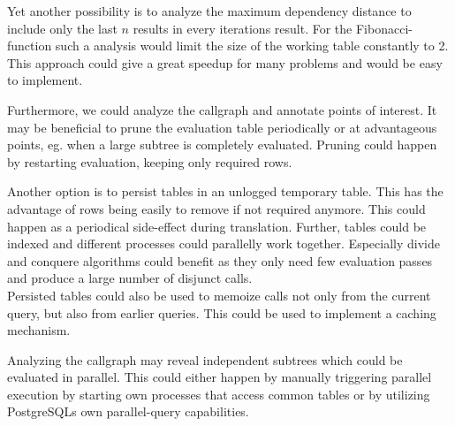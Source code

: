 Yet another possibility is to analyze the maximum dependency distance to include only the last $n$ results in every iterations result. For the Fibonacci-function such a analysis would limit the size of the working table constantly to 2. This approach could give a great speedup for many problems and would be easy to implement.

Furthermore, we could analyze the callgraph and annotate points of interest. It may be beneficial to prune the evaluation table periodically or at advantageous points, eg. when a large subtree is completely evaluated. Pruning could happen by restarting evaluation, keeping only required rows.

Another option is to persist tables in an unlogged temporary table. This has the advantage of rows being easily to remove if not required anymore. This could happen as a periodical side-effect during translation. Further, tables could be indexed and different processes could parallelly work together. Especially divide and conquere algorithms could benefit as they only need few evaluation passes and produce a large number of disjunct calls.\\
Persisted tables could also be used to memoize calls not only from the current query, but also from earlier queries. This could be used to implement a caching mechanism.

Analyzing the callgraph may reveal independent subtrees which could be evaluated in parallel. This could either happen by manually triggering parallel execution by starting own processes that access common tables or by utilizing PostgreSQLs own parallel-query capabilities. 